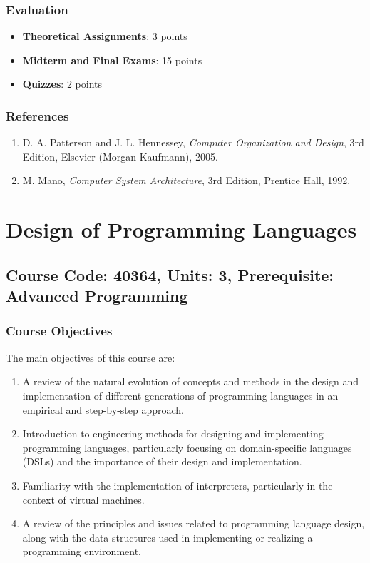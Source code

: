 \documentclass[12pt]{article}
\begin{document}
\subsubsection*{Evaluation}
\begin{itemize}
    \item \textbf{Theoretical Assignments}: 3 points
    \item \textbf{Midterm and Final Exams}: 15 points
    \item \textbf{Quizzes}: 2 points
\end{itemize}

\subsubsection*{References}
\begin{enumerate}
    \item D. A. Patterson and J. L. Hennessey, \textit{Computer Organization and Design}, 3rd Edition, Elsevier (Morgan Kaufmann), 2005.
    \item M. Mano, \textit{Computer System Architecture}, 3rd Edition, Prentice Hall, 1992.
\end{enumerate}

\newpage

\section{Design of Programming Languages}
\subsection*{Course Code: 40364, Units: 3, Prerequisite: Advanced Programming}

\subsubsection*{Course Objectives}
The main objectives of this course are: 
\begin{enumerate}
    \item A review of the natural evolution of concepts and methods in the design and implementation of different generations of programming languages in an empirical and step-by-step approach.
    \item Introduction to engineering methods for designing and implementing programming languages, particularly focusing on domain-specific languages (DSLs) and the importance of their design and implementation.
    \item Familiarity with the implementation of interpreters, particularly in the context of virtual machines.
    \item A review of the principles and issues related to programming language design, along with the data structures used in implementing or realizing a programming environment.
\end{enumerate}
\end{document}
